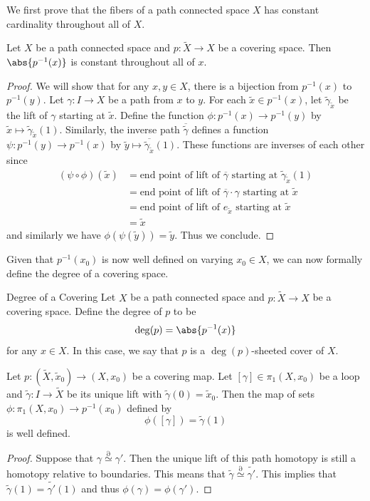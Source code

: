 \documentclass[a4paper]{article}
\begin{document}
We first prove that the fibers of a path connected space $X$ has constant cardinality throughout all of $X$. 

\begin{lmm}{}{} Let $X$ be a path connected space and $p:\tilde{X}\to X$ be a covering space. Then $\abs{p^{-1}(x)}$ is constant throughout all of $x$. \tcbline
\begin{proof}
We will show that for any $x,y\in X$, there is a bijection from $p^{-1}(x)$ to $p^{-1}(y)$. Let $\gamma:I\to X$ be a path from $x$ to $y$. For each $\tilde{x}\in p^{-1}(x)$, let $\tilde{\gamma}_{\tilde{x}}$ be the lift of $\gamma$ starting at $\tilde{x}$. Define the function $\phi:p^{-1}(x)\to p^{-1}(y)$ by $\tilde{x}\mapsto\tilde{\gamma}_{\tilde{x}}(1)$. Similarly, the inverse path $\overline{\tilde{\gamma}}$ defines a function $\psi:p^{-1}(y)\to p^{-1}(x)$ by $\tilde{y}\mapsto\overline{\tilde{\gamma}_{\tilde{x}}}(1)$. These functions are inverses of each other since 
\begin{align*}
(\psi\circ\phi)(\tilde{x})&=\text{end point of lift of }\overline{\gamma}\text{ starting at }\tilde{\gamma}_{\tilde{x}}(1)\\
&=\text{end point of lift of }\overline{\gamma}\cdot\gamma\text{ starting at }\tilde{x}\\
&=\text{end point of lift of }e_{\tilde{x}}\text{ starting at }\tilde{x}\\
&=\tilde{x}
\end{align*}
and similarly we have $\phi(\psi(\tilde{y}))=\tilde{y}$. Thus we conclude. 
\end{proof}
\end{lmm}

Given that $p^{-1}(x_0)$ is now well defined on varying $x_0\in X$, we can now formally define the degree of a covering space. 

\begin{defn}{Degree of a Covering}{} Let $X$ be a path connected space and $p:\tilde{X}\to X$ be a covering space. Define the degree of $p$ to be $$\deg(p)=\abs{p^{-1}(x)}$$ for any $x\in X$. In this case, we say that $p$ is a $\deg(p)$-sheeted cover of $X$. 
\end{defn}

\begin{lmm}{}{} Let $p:(\tilde{X},\tilde{x}_0)\to(X,x_0)$ be a covering map. Let $[\gamma]\in\pi_1(X,x_0)$ be a loop and $\tilde{\gamma}:I\to\tilde{X}$ be its unique lift with $\tilde{\gamma}(0)=\tilde{x}_0$. Then the map of sets $\phi:\pi_1(X,x_0)\to p^{-1}(x_0)$ defined by $$\phi([\gamma])=\tilde{\gamma}(1)$$ is well defined. \tcbline
\begin{proof}
Suppose that $\gamma\overset{\partial}{\simeq}\gamma'$. Then the unique lift of this path homotopy is still a homotopy relative to boundaries. This means that $\tilde{\gamma}\overset{\partial}{\simeq}\tilde{\gamma'}$. This implies that $\tilde{\gamma}(1)=\tilde{\gamma'}(1)$ and thus $\phi(\gamma)=\phi(\gamma')$. 
\end{proof}
\end{lmm}
\end{document}
